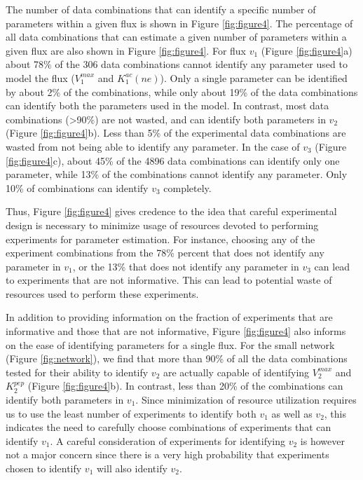\documentclass[10pt]{article}
\begin{document}
The number of data combinations that can identify a specific number of parameters within a given flux is shown in Figure \ref{fig:figure4}. The percentage of all data combinations that can estimate a given number of parameters within a given flux are also shown in Figure \ref{fig:figure4}. For flux $v_1$ (Figure \ref{fig:figure4}a) about 78\% of the 306 data combinations cannot identify any parameter used to model the flux ($V_1^{max}$ and $K_1^{ac}(ne)$). Only a single parameter can be identified by about 2\% of the combinations, while only about 19\% of the data combinations can identify both the parameters used in the model. 	
In contrast, most data combinations (>90\%) are not wasted, and can identify both parameters in $v_2$ (Figure \ref{fig:figure4}b). Less than 5\% of the experimental data combinations are wasted from not being able to identify any parameter. In the case of $v_3$ (Figure \ref{fig:figure4}c), about 45\% of the 4896 data combinations can identify only one parameter, while 13\% of the combinations cannot identify any parameter. Only 10\% of combinations can identify $v_3$ completely. 

Thus, Figure \ref{fig:figure4} gives credence to the idea that careful experimental design is necessary to minimize usage of resources devoted to performing experiments for parameter estimation. For instance, choosing any of the experiment combinations from the 78\% percent that does not identify any parameter in $v_1$, or the 13\% that does not identify any parameter in $v_3$ can lead to experiments that are not informative. This can lead to potential waste of resources used to perform these experiments.	 

In addition to providing information on the fraction of experiments that are informative and those that are not informative, Figure \ref{fig:figure4} also informs on the ease of identifying parameters for a single flux. For the small network (Figure \ref{fig:network}), we find that more than 90\% of all the data combinations tested for their ability to identify $v_2$ are actually capable of identifying $V_2^{max}$ and $K_2^{pep}$ (Figure \ref{fig:figure4}b). In contrast, less than 20\% of the combinations can identify both parameters in $v_1$. Since minimization of resource utilization requires us to use the least number of experiments to identify both $v_1$ as well as $v_2$, this indicates the need to carefully choose combinations of experiments that can identify $v_1$. A careful consideration of experiments for identifying $v_2$ is however not a major concern since there is a very high probability that experiments chosen to identify $v_1$ will also identify $v_2$. 	
\end{document}
